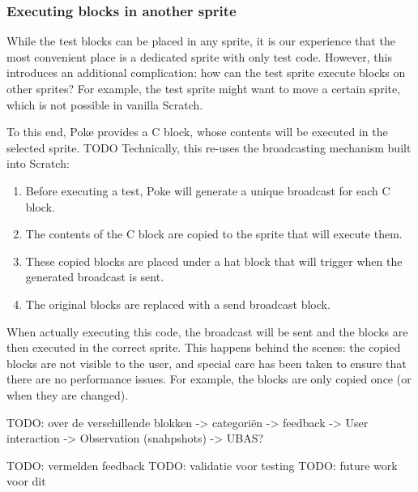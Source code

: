 \documentclass[../main]{subfiles}
\begin{document}
\subsubsection{Executing blocks in another sprite}

While the test blocks can be placed in any sprite, it is our experience that the most convenient place is a dedicated sprite with only test code.
However, this introduces an additional complication: how can the test sprite execute blocks on other sprites?
For example, the test sprite might want to move a certain sprite, which is not possible in vanilla Scratch.

To this end, Poke provides a C block, whose contents will be executed in the selected sprite.
TODO
Technically, this re-uses the broadcasting mechanism built into Scratch:

\begin{enumerate}
    \item Before executing a test, Poke will generate a unique broadcast for each C block.
    \item The contents of the C block are copied to the sprite that will execute them.
    \item These copied blocks are placed under a hat block that will trigger when the generated broadcast is sent.
    \item The original blocks are replaced with a send broadcast block.
\end{enumerate}

When actually executing this code, the broadcast will be sent and the blocks are then executed in the correct sprite.
This happens behind the scenes: the copied blocks are not visible to the user, and special care has been taken to ensure that there are no performance issues.
For example, the blocks are only copied once (or when they are changed).




TODO: over de verschillende blokken
-> categoriën
-> feedback
-> User interaction
-> Observation (snahpshots)
-> UBAS?

TODO: vermelden feedback
TODO: validatie voor testing
TODO: future work voor dit

\end{document}
